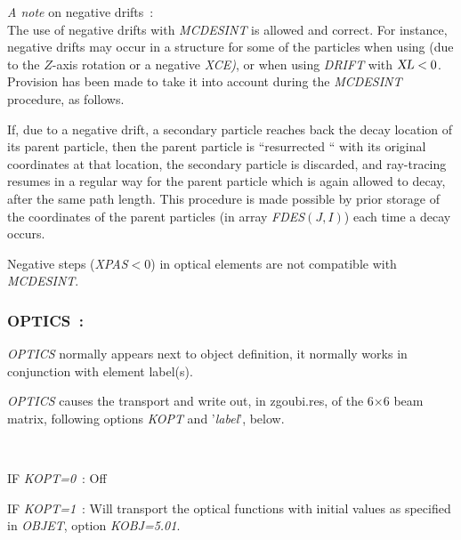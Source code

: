 \noindent \textsl {A  note}  on negative drifts~: \\
The use  of  negative  drifts  with  \textsl{MCDESINT}  is  allowed 
and correct. 
For instance,  negative drifts  may  occur  in  a  structure   for 
some  of  the  particles  when  using  \CHANGREF{} (due to  the  $ Z$-axis 
rotation  or  a negative  \textsl{XCE)},  or  when  using  \textsl{DRIFT}  with 
$\textsl{XL}<0$. 
Provision  has  been  made  to  take  it  into  account during  the \textsl{MCDESINT}
 procedure,  as follows. 

\noindent If, due   to  a  negative  drift,   a  secondary  particle  reaches 
back the  decay location of its parent particle, then 
the parent  particle  is  ``resurrected `` with its original coordinates 
at  that  location, the   secondary   particle   is   discarded, and 
ray-tracing  resumes  in  a  regular way  for the parent  particle which  
is again allowed to decay,  after  the  same path length. This  procedure  is made 
possible  by  prior storage  of  the  coordinates of the parent  
particles (in array \textsl{FDES}$(J,I)$) each  time  a  decay  occurs. 

\noindent Negative steps (\textsl{XPAS}$<0$) in
optical elements are not compatible with  \textsl{MCDESINT}.  







\newpage

\subsubsection*{OPTICS~: \OPTICSTitl} \label{OPTICS} 

\medskip

\textsl{OPTICS}  normally appears next to object definition, it normally works in conjunction with 
element label(s). 

\noindent \textsl{OPTICS}  causes the transport and  write out, in zgoubi.res, of the 6$\times$6 beam matrix, 
following options \textsl{KOPT} and '\textsl{label}', below. 

~

\noindent IF \textsl{KOPT=0}~: Off

\noindent IF \textsl{KOPT=1}~: Will transport the optical functions with initial values as specified in \textsl{OBJET}, option 
 \textsl{KOBJ=5.01}. 


